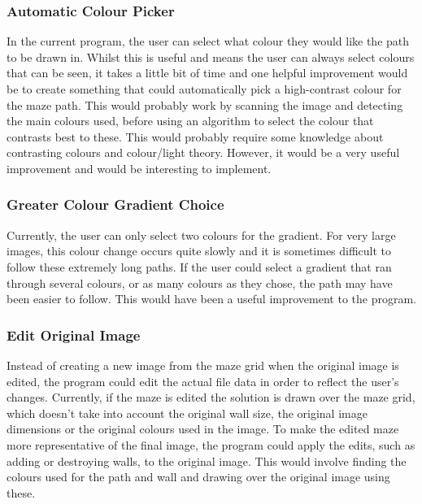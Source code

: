 \documentclass[titlepage]{article}
\begin{document}
\subsubsection{Automatic Colour Picker}
In the current program, the user can select what colour they would like the path to be drawn in. Whilst this is useful and means the user can always select colours that can be seen, it takes a little bit of time and one helpful improvement would be to create something that could automatically pick a high-contrast colour for the maze path. This would probably work by scanning the image and detecting the main colours used, before using an algorithm to select the colour that contrasts best to these. This would probably require some knowledge about contrasting colours and colour/light theory. However, it would be a very useful improvement and would be interesting to implement.

\subsubsection{Greater Colour Gradient Choice}
Currently, the user can only select two colours for the gradient. For very large images, this colour change occurs quite slowly and it is sometimes difficult to follow these extremely long paths. If the user could select a gradient that ran through several colours, or as many colours as they chose, the path may have been easier to follow. This would have been a useful improvement to the program.

\subsubsection{Edit Original Image}
Instead of creating a new image from the maze grid when the original image is edited, the program could edit the actual file data in order to reflect the user's changes. Currently, if the maze is edited the solution is drawn over the maze grid, which doesn't take into account the original wall size, the original image dimensions or the original colours used in the image. To make the edited maze more representative of the final image, the program could apply the edits, such as adding or destroying walls, to the original image. This would involve finding the colours used for the path and wall and drawing over the original image using these.
\end{document}

